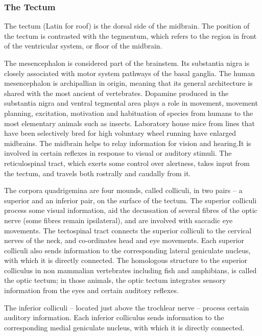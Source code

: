 \hypertarget{the-tectum}{%
\subsubsection{The Tectum}\label{the-tectum}}

The tectum (Latin for roof) is the dorsal side of the midbrain. The position of the tectum is contrasted with the tegmentum, which refers to the region in front of the ventricular system, or floor of the midbrain.

The mesencephalon is considered part of the brainstem. Its substantia nigra is closely associated with motor system pathways of the basal ganglia. The human mesencephalon is archipallian in origin, meaning that its general architecture is shared with the most ancient of vertebrates. Dopamine produced in the substantia nigra and ventral tegmental area plays a role in movement, movement planning, excitation, motivation and habituation of species from humans to the most elementary animals such as insects. Laboratory house mice from lines that have been selectively bred for high voluntary wheel running have enlarged midbrains. The midbrain helps to relay information for vision and hearing.It is involved in certain reflexes in response to visual or auditory stimuli. The reticulospinal tract, which exerts some control over alertness, takes input from the tectum, and travels both rostrally and caudally from it.

The corpora quadrigemina are four mounds, called colliculi, in two pairs -- a superior and an inferior pair, on the surface of the tectum. The superior colliculi process some visual information, aid the decussation of several fibres of the optic nerve (some fibres remain ipsilateral), and are involved with saccadic eye movements. The tectospinal tract connects the superior colliculi to the cervical nerves of the neck, and co-ordinates head and eye movements. Each superior colliculi also sends information to the corresponding lateral geniculate nucleus, with which it is directly connected. The homologous structure to the superior colliculus in non mammalian vertebrates including fish and amphibians, is called the optic tectum; in those animals, the optic tectum integrates sensory information from the eyes and certain auditory reflexes.

The inferior colliculi -- located just above the trochlear nerve -- process certain auditory information. Each inferior colliculus sends information to the corresponding medial geniculate nucleus, with which it is directly connected.

